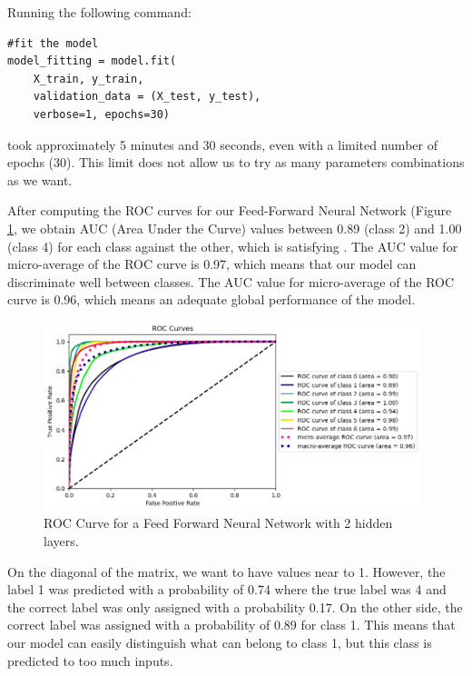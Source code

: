 \documentclass[letterpaper,12pt]{article}
\begin{document}
\par Running the following command:
\begin{lstlisting}
#fit the model
model_fitting = model.fit(
    X_train, y_train,
    validation_data = (X_test, y_test),
    verbose=1, epochs=30)  
\end{lstlisting}
took approximately 5 minutes and 30 seconds, even with a limited number of epochs (30). This limit does not allow us to try as many parameters combinations as we want.
\par After computing the ROC curves for our Feed-Forward Neural Network (Figure \ref{FFNN_ROC}, we obtain AUC (Area Under the Curve) values between 0.89 (class 2) and 1.00 (class 4) for each class against the other, which is satisfying \cite{MANDREKAR20101315}. The AUC value for micro-average of the ROC curve is 0.97, which means that our model can discriminate well between classes. The AUC value for micro-average of the ROC curve is 0.96, which means an adequate global performance of the model.
\begin{figure}[H]
    \centering
    \includegraphics[width=11cm]{ROC_FFNN.png}
    \caption{\centering ROC Curve for a Feed Forward Neural Network with 2 hidden layers.}
    \label{FFNN_ROC}
\end{figure}
\par On the diagonal of the matrix, we want to have values near to 1. However, the label 1 was predicted with a probability of 0.74 where the true label was 4 and the correct label was only assigned with a probability 0.17. On the other side, the correct label was assigned with a probability of 0.89 for class 1. This means that our model can easily distinguish what can belong to class 1, but this class is predicted to too much inputs. 
\end{document}

